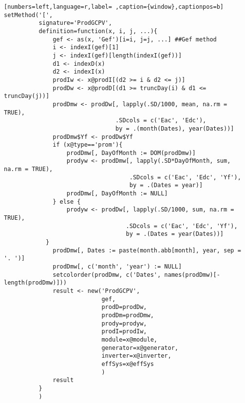 \begin{lstlisting}[numbers=left,language=r,label= ,caption={window},captionpos=b]
setMethod('[',
          signature='ProdGCPV',
          definition=function(x, i, j, ...){
              gef <- as(x, 'Gef')[i=i, j=j, ...] ##Gef method
              i <- indexI(gef)[1]
              j <- indexI(gef)[length(indexI(gef))]
              d1 <- indexD(x)
              d2 <- indexI(x)
              prodIw <- x@prodI[(d2 >= i & d2 <= j)]
              prodDw <- x@prodD[(d1 >= truncDay(i) & d1 <= truncDay(j))]
              prodDmw <- prodDw[, lapply(.SD/1000, mean, na.rm = TRUE),
                                .SDcols = c('Eac', 'Edc'),
                                by = .(month(Dates), year(Dates))]
              prodDmw$Yf <- prodDw$Yf
              if (x@type=='prom'){
                  prodDmw[, DayOfMonth := DOM(prodDmw)]
                  prodyw <- prodDmw[, lapply(.SD*DayOfMonth, sum, na.rm = TRUE),
                                    .SDcols = c('Eac', 'Edc', 'Yf'),
                                    by = .(Dates = year)]
                  prodDmw[, DayOfMonth := NULL]
              } else {
                  prodyw <- prodDw[, lapply(.SD/1000, sum, na.rm = TRUE),
                                   .SDcols = c('Eac', 'Edc', 'Yf'),
                                   by = .(Dates = year(Dates))]
            }
              prodDmw[, Dates := paste(month.abb[month], year, sep = '. ')]
              prodDmw[, c('month', 'year') := NULL]
              setcolorder(prodDmw, c('Dates', names(prodDmw)[-length(prodDmw)]))
              result <- new('ProdGCPV',
                            gef,
                            prodD=prodDw,
                            prodDm=prodDmw,
                            prody=prodyw,
                            prodI=prodIw,
                            module=x@module,
                            generator=x@generator,
                            inverter=x@inverter,
                            effSys=x@effSys
                            )
              result
          }
          )


\end{lstlisting}

